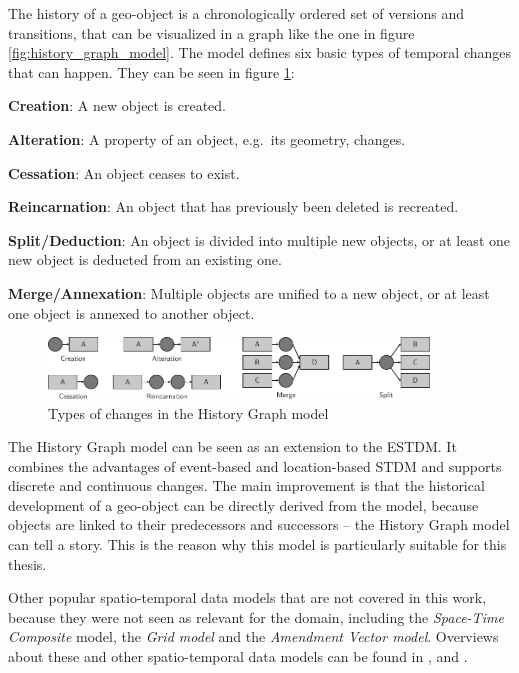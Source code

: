 The history of a geo-object is a chronologically ordered set of versions and transitions, that can be visualized in a graph like the one in figure \ref{fig:history_graph_model}.
The model defines six basic types of temporal changes that can happen. They can be seen in figure \ref{fig:history_graph_changes}:

\begin{compactitem}
  \item \textbf{Creation}:           A new object is created.
  \item \textbf{Alteration}:         A property of an object, e.g.\ its geometry, changes.
  \item \textbf{Cessation}:          An object ceases to exist.
  \item \textbf{Reincarnation}:      An object that has previously been deleted is recreated.
  \item \textbf{Split/Deduction}:    An object is divided into multiple new objects, or at least one new object is deducted from an existing one.
  \item \textbf{Merge/Annexation}:   Multiple objects are unified to a new object, or at least one object is annexed to another object.
\end{compactitem}

\begin{figure}[ht]
  \vspace{1em}
  \centering
  \includegraphics[width=0.9\textwidth]{graphics/basics/stdm/history_graph_changes}
  \caption{Types of changes in the History Graph model}
  \label{fig:history_graph_changes}
\end{figure}

The History Graph model can be seen as an extension to the ESTDM. It combines the advantages of event-based and location-based STDM and supports discrete and continuous changes. The main improvement is that the historical development of a geo-object can be directly derived from the model, because objects are linked to their predecessors and successors -- the History Graph model can tell a story. This is the reason why this model is particularly suitable for this thesis.


\vspace{1em}
Other popular spatio-temporal data models that are not covered in this work, because they were not seen as relevant for the domain, including the \emph{Space-Time Composite} model, the \emph{Grid model} and the \emph{Amendment Vector model}. Overviews about these and other spatio-temporal data models can be found in \cite{zhao11}, \cite{pelekis04stdms} and \cite{peuquet99}.


